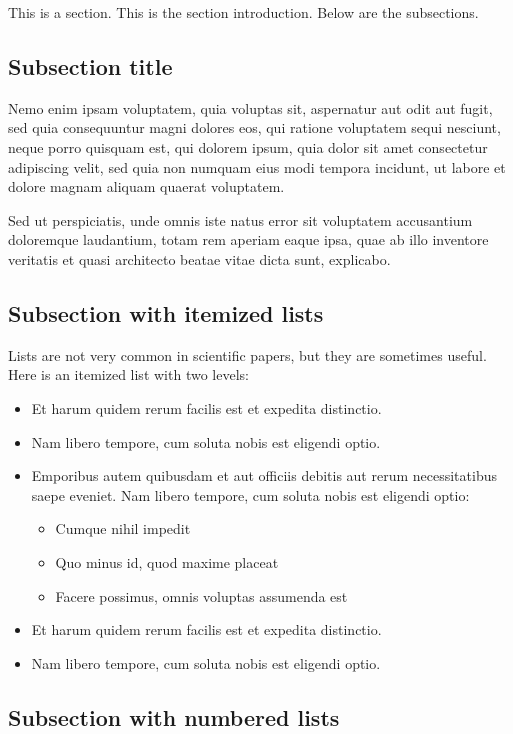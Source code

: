 \documentclass[letterpaper,12pt,leqno]{article}
\begin{document}
This is a section. This is the section introduction. Below are the subsections. 

\subsection{Subsection title}

Nemo enim ipsam voluptatem, quia voluptas sit, aspernatur aut odit aut fugit, sed quia consequuntur magni dolores eos, qui ratione voluptatem sequi nesciunt, neque porro quisquam est, qui dolorem ipsum, quia dolor sit amet consectetur adipiscing velit, sed quia non numquam eius modi tempora incidunt, ut labore et dolore magnam aliquam quaerat voluptatem. 

Sed ut perspiciatis, unde omnis iste natus error sit voluptatem accusantium doloremque laudantium, totam rem aperiam eaque ipsa, quae ab illo inventore veritatis et quasi architecto beatae vitae dicta sunt, explicabo. 

\subsection{Subsection with itemized lists}

Lists are not very common in scientific papers, but they are sometimes useful. Here is an itemized list with two levels:
\begin{itemize}
\item Et harum quidem rerum facilis est et expedita distinctio.
\item Nam libero tempore, cum soluta nobis est eligendi optio.
\item Emporibus autem quibusdam et aut officiis debitis aut rerum necessitatibus saepe eveniet. Nam libero tempore, cum soluta nobis est eligendi optio:
\begin{itemize}
\item Cumque nihil impedit
\item Quo minus id, quod maxime placeat
\item Facere possimus, omnis voluptas assumenda est
\end{itemize}
\item Et harum quidem rerum facilis est et expedita distinctio.
\item Nam libero tempore, cum soluta nobis est eligendi optio.
\end{itemize}

\subsection{Subsection with numbered lists}\label{s:lists}
\end{document}
